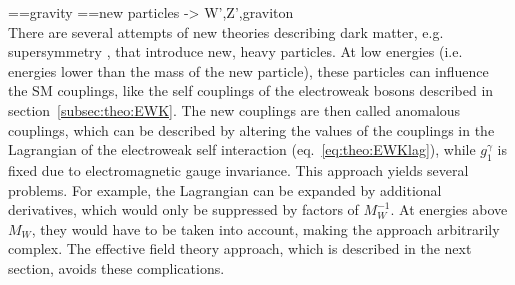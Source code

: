 ==gravity
==new particles -> W',Z',graviton\\
There are several attempts of new theories describing dark matter, e.g. supersymmetry \cite{SUSY}, that introduce new, heavy particles. At low energies (i.e. energies lower than the mass of the new particle), these particles can influence the SM couplings, like the self couplings of the electroweak bosons described in section~\ref{subsec:theo:EWK}. The new couplings are then called anomalous couplings, which can be described by altering the values of the couplings in the Lagrangian of the electroweak self interaction (eq.~\ref{eq:theo:EWKlag}), while $g_1^\gamma$ is fixed due to electromagnetic gauge invariance. This approach yields several problems. For example, the Lagrangian can be expanded by additional derivatives, which would only be suppressed by factors of $M_W^{-1}$. At energies above $M_W$, they would have to be taken into account, making the approach arbitrarily complex. The effective field theory approach, which is described in the next section, avoids these complications.



